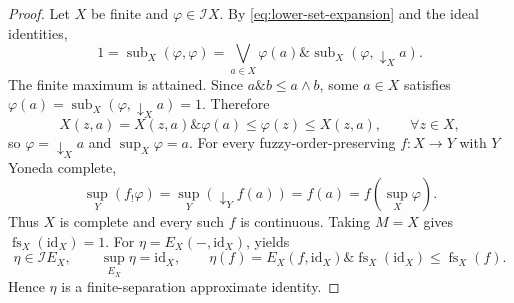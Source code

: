 \documentclass[preprint,3p,times]{elsarticle}
\theoremstyle{definition}
\newtheorem{example}[example]{Example}
\theoremstyle{remark}
\newcommand{\I}{\mathcal{I}}
\newcommand{\id}{\mathrm{id}}
\newcommand{\supop}{\operatorname{sup}}
\newcommand{\fs}{\operatorname{fs}}
\newcommand{\subdeg}{\operatorname{sub}}
\newcommand{\tn}{\mathbin{\&}}
\numberwithin{equation}{section}
\begin{document}
\begin{proof}
Let \(X\) be finite and \(\varphi\in\I X\). By
\eqref{eq:lower-set-expansion} and the ideal identities,
\[
 1=\subdeg_X(\varphi,\varphi)
  =\bigvee_{a\in X}
    \varphi(a)\tn\subdeg_X(\varphi,\downarrow_X a).
\]
The finite maximum is attained. Since \(a\tn b\leq a\wedge b\), some
\(a\in X\) satisfies
\(\varphi(a)=\subdeg_X(\varphi,\downarrow_X a)=1\). Therefore
\[
 X(z,a)=X(z,a)\tn\varphi(a)\leq\varphi(z)\leq X(z,a),
 \qquad \forall z\in X,
\]
so \(\varphi=\downarrow_X a\) and \(\supop_X\varphi=a\).
For every fuzzy-order-preserving \(f\colon X\to Y\) with \(Y\) Yoneda complete,
\[
 \supop_Y(f_!\varphi)
 =\supop_Y(\downarrow_Y f(a))
 =f(a)=f(\supop_X\varphi).
\]
Thus \(X\) is complete and every such \(f\) is continuous.
Taking \(M=X\) gives \(\fs_X(\id_X)=1\). For
\(\eta=E_X(-,\id_X)\),  yields
\[
 \eta\in\I E_X,\qquad \supop_{E_X}\eta=\id_X,
 \qquad
 \eta(f)=E_X(f,\id_X)\tn\fs_X(\id_X)\leq\fs_X(f).
\]
Hence \(\eta\) is a finite-separation approximate identity.
\end{proof}



\end{document}
